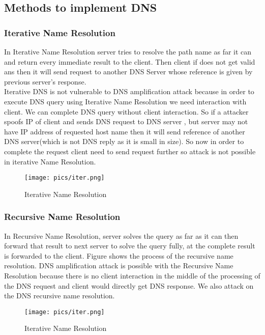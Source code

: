 \documentclass[11pt]{article}
\begin{document}
\subsection{Methods to implement DNS}
\subsubsection{Iterative Name Resolution}
In Iterative Name Resolution server tries to resolve the path name as far it can and return every immediate result to the client. Then client if does not get valid ans then it will send request to another DNS Server whose reference is given by previous server's response. \\
Iterative DNS is not vulnerable to DNS amplification attack because in order to execute DNS query using Iterative Name Resolution we need interaction with client. We can complete DNS query without client interaction. So if a attacker spoofs IP of client and sends DNS request to DNS server , but server may not have IP address of requested host name then it will send reference of another DNS server(which is not DNS reply as it is small in size). So now in order to complete the request client need to send request further so attack is not possible in iterative Name Resolution.
\begin{figure}
\texttt{[image: pics/iter.png]}
\caption{Iterative Name Resolution}
\end{figure}
\subsubsection{Recursive Name Resolution}
In Recursive Name Resolution, server solves the query as far as it can then forward that result to next server to solve the query fully, at the complete result is forwarded to the client. Figure shows the process of the recursive name resolution. 
DNS amplification attack is possible with the Recursive Name Resolution because there is no client interaction in the middle of the processing of the DNS request and client would directly get DNS response. We also attack on the DNS recursive name resolution.
\begin{figure}
\texttt{[image: pics/iter.png]}
\caption{Iterative Name Resolution}
\end{figure}
\end{document}
